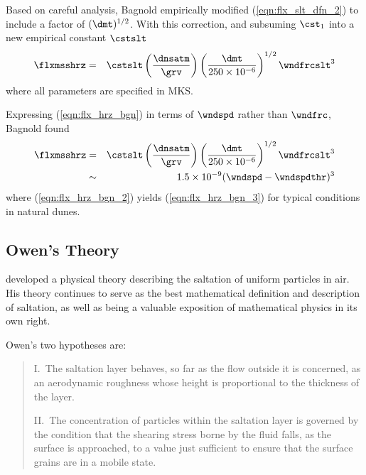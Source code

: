 \documentclass[12pt,twoside]{book}
\begin{document}
Based on careful analysis, Bagnold empirically modified
(\ref{eqn:flx_slt_dfn_2}) to include a factor of $(\dmt)^{1/2}$.
With this correction, and subsuming $\cst_{1}$ into a new empirical
constant $\cstslt$ 
\begin{eqnarray}
\flxmsshrz & = & \cstslt \left( \frac{\dnsatm}{\grv } \right) 
\left( \frac{\dmt}{250 \times 10^{-6} } \right)^{1/2} \wndfrcslt^{3} 
\label{eqn:flx_hrz_bgn}
\end{eqnarray}
where all parameters are specified in MKS.

Expressing (\ref{eqn:flx_hrz_bgn}) in terms of $\wndspd$ rather than
$\wndfrc$, Bagnold found
\begin{eqnarray}
\label{eqn:flx_hrz_bgn_2}
\flxmsshrz & = & \cstslt \left( \frac{\dnsatm}{\grv } \right) 
\left( \frac{\dmt}{250 \times 10^{-6} } \right)^{1/2} \wndfrcslt^{3} \\
\label{eqn:flx_hrz_bgn_3}
& \sim & 1.5 \times 10^{-9} ( \wndspd - \wndspdthr )^{3}
\end{eqnarray}
where (\ref{eqn:flx_hrz_bgn_2}) yields (\ref{eqn:flx_hrz_bgn_3}) for
typical conditions in natural dunes.

\subsection[Owen's Theory]{Owen's Theory}\label{sxn:hrz_Owe64}
\cite{Owe64} developed a physical theory describing the saltation of
uniform particles in air.
His theory continues to serve as the best mathematical definition and
description of saltation, as well as being a valuable exposition of
mathematical physics in its own right.

Owen's two hypotheses are:
\begin{quotation}
I.~The saltation layer behaves, so far as the flow outside it is
concerned, as an aerodynamic roughness whose height is proportional to
the thickness of the layer.

II.~The concentration of particles within the saltation layer is
governed by the condition that the shearing stress borne by the fluid
falls, as the surface is approached, to a value just sufficient to
ensure that the surface grains are in a mobile state.
\end{quotation}
\end{document}
